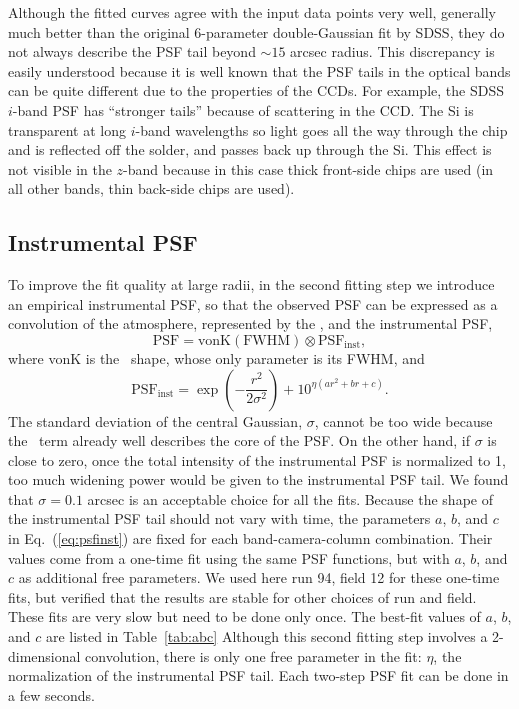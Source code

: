 Although the fitted
curves agree with the input data points very well, generally much better than the
original 6-parameter double-Gaussian fit by SDSS, they do not always describe
the PSF tail beyond $\sim 15$ arcsec radius. This discrepancy is easily understood
because it is well known that the PSF tails in the optical bands can be quite
different due to the properties of the CCDs.
For example, the SDSS $i$-band PSF has ``stronger tails''
because of scattering in the CCD.  The Si is transparent at long $i$-band wavelengths 
so light goes all the way through the chip and is reflected off the solder, and passes 
back up through the Si. This effect is not visible in the $z$-band because in this case
thick front-side chips are used (in all other bands, thin back-side chips are used). 



\subsection{Instrumental PSF \label{sec:instrPSF}} 

To improve the fit quality at large radii, in the second fitting step we introduce an
empirical instrumental PSF, so that the observed PSF can be expressed as
a convolution of the atmosphere, represented by the \vk, and
the instrumental PSF,
\begin{equation}
        \textrm{PSF} = \textrm{vonK} (\textrm{FWHM}) \otimes \textrm{PSF}_{\textrm{inst}},
\end{equation} 
where vonK is the \vk~shape, whose only parameter is its FWHM, and
\begin{equation}
        \textrm{PSF}_{\textrm{inst}} = \exp(-\frac{r^2}{2\sigma^2}) + 10^{\eta(ar^2+br+c)}.
\label{eq:psfinst}
\end{equation} 
The standard deviation of the central Gaussian, $\sigma$, cannot be
too wide because the \vk~term already well describes the core of the PSF.
On the other hand, if $\sigma$ is close to zero, once the
total intensity of the instrumental PSF is normalized to 1, too much
widening power would be given to the instrumental PSF tail.
We found that $\sigma = 0.1$ arcsec is an acceptable choice for all the fits.
Because the shape of the instrumental PSF tail should not vary with
time, the parameters $a$, $b$, and $c$ in Eq.~(\ref{eq:psfinst}) are
fixed for each band-camera-column combination.
Their values come from a one-time fit using the same PSF functions,
but with $a$, $b$, and $c$ as additional free parameters.
We used here run 94, field 12 for these one-time fits, but verified that 
the results are stable for other choices of run and field. 
These fits are very slow but need to be done only once.
The best-fit values of $a$, $b$, and $c$ are listed in Table~\ref{tab:abc}
Although this second fitting step involves a 2-dimensional convolution,
there is only one free parameter in the fit: $\eta$, the normalization of the
instrumental PSF tail. Each two-step PSF fit can be done in a few seconds.

